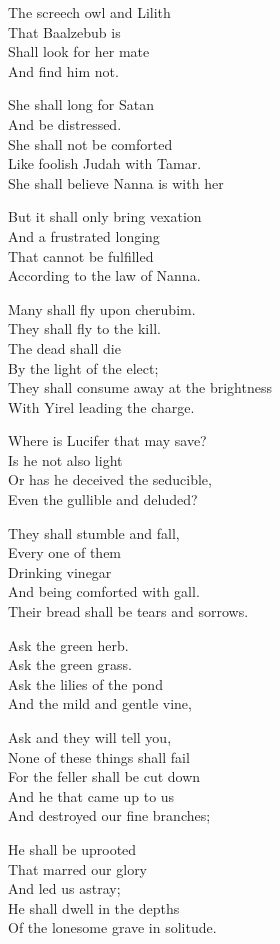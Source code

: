 \documentclass[
]{book}
\begin{document}
The screech owl and Lilith\\
That Baalzebub is\\
Shall look for her mate\\
And find him not.

She shall long for Satan\\
And be distressed.\\
She shall not be comforted\\
Like foolish Judah with Tamar.\\
She shall believe Nanna is with her

But it shall only bring vexation\\
And a frustrated longing\\
That cannot be fulfilled\\
According to the law of Nanna.

Many shall fly upon cherubim.\\
They shall fly to the kill.\\
The dead shall die\\
By the light of the elect;\\
They shall consume away at the brightness\\
With Yirel leading the charge.

Where is Lucifer that may save?\\
Is he not also light\\
Or has he deceived the seducible,\\
Even the gullible and deluded?

They shall stumble and fall,\\
Every one of them\\
Drinking vinegar\\
And being comforted with gall.\\
Their bread shall be tears and sorrows.

Ask the green herb.\\
Ask the green grass.\\
Ask the lilies of the pond\\
And the mild and gentle vine,

Ask and they will tell you,\\
None of these things shall fail\\
For the feller shall be cut down\\
And he that came up to us\\
And destroyed our fine branches;

He shall be uprooted\\
That marred our glory\\
And led us astray;\\
He shall dwell in the depths\\
Of the lonesome grave in solitude.
\end{document}
